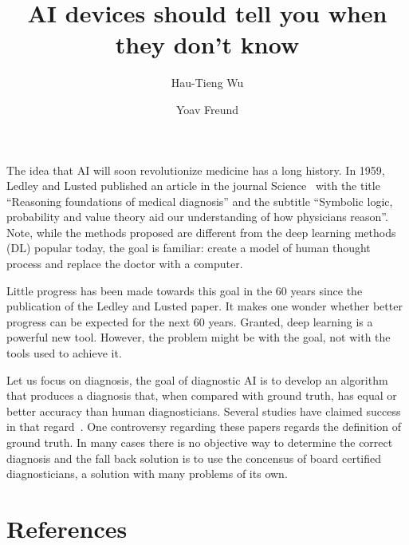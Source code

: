 \documentclass[11pt]{pnas-new}
\author[1]{Hau-Tieng Wu}
\author[2]{Yoav Freund}
\affil[1]{Duke, Mathematics and Statistical Science, Durham, 27708, USA}
\affil[2]{UCSD, Computer Science, San Diego, 92093, United States. yfreund@eng.ucsd.edu}
\title{AI devices should tell you when they don't know}
\begin{document}
\maketitle

The idea that AI will soon revolutionize medicine has a long history.
In 1959, Ledley and Lusted published an article in the journal
Science~\cite{ledley1959reasoning} with the title ``Reasoning
foundations of medical diagnosis'' and the subtitle ``Symbolic logic,
probability and value theory aid our understanding of how physicians
reason''. Note, while the methods proposed are different from the deep
learning methods (DL) popular today, the goal is familiar: create a
model of human thought process and replace the doctor with a computer.

Little progress has been made towards this goal in the 60 years since
the publication of the Ledley and Lusted paper. It makes one wonder
whether better progress can be expected for the next 60
years. Granted, deep learning is a powerful new tool. However, the
problem might be with the goal, not with the tools used to achieve it.

Let us focus on diagnosis, the goal of diagnostic AI is to develop an
algorithm that produces a diagnosis that, when compared with ground
truth, has equal or better accuracy than human diagnosticians. Several
studies have claimed success in that regard~\cite{}. One controversy
regarding these papers regards the definition of ground truth. In many
cases there is no objective way to determine the correct diagnosis and
the fall back solution is to use the concensus of board certified
diagnosticians, a solution with many problems of its own.


\section{References}
%  

\end{document}
